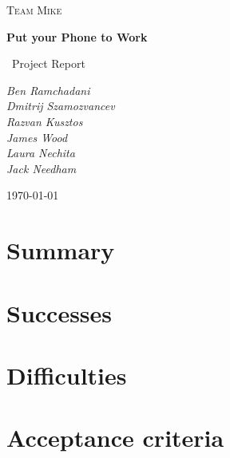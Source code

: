 \documentclass[a4paper,10pt]{article}
\title{}
\author{}
\date{}
\begin{document}
\begin{titlepage}
	\centering
	
	{\scshape\Large Team Mike\par}
	\vspace{4cm}
	{\huge\bfseries Put your Phone to Work\par}
	\vspace{1.5cm}
	{\Large\
	Project Report
	\par}
	\vspace{2cm}
	{\Large\itshape 
	      Ben Ramchadani\\
	      Dmitrij Szamozvancev\\
	      Razvan Kusztos\\
	      James Wood \\
	      Laura Nechita \\
	      Jack Needham
	      \par}
	\vfill

	{\large \today\par}
\end{titlepage}
\maketitle
\tableofcontents
\newpage
\section{Summary}


\section{Successes}


\section{Difficulties}


\section{Acceptance criteria}
\end{document}
